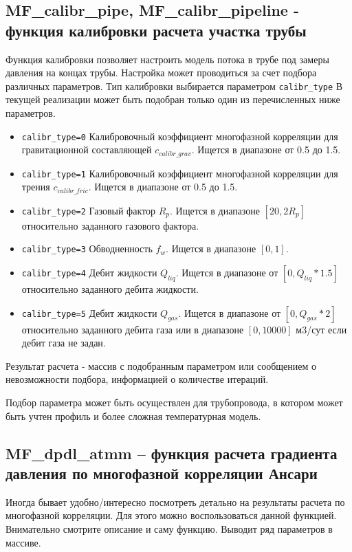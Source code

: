 \subsection{MF\_calibr\_pipe, MF\_calibr\_pipeline - функция калибровки расчета участка трубы}

Функция калибровки позволяет настроить модель потока в трубе под замеры давления на концах трубы. Настройка может проводиться за счет подбора различных параметров. Тип калибровки выбирается параметром \texttt{calibr_type} В текущей реализации может быть подобран только один из перечисленных ниже параметров.

\begin{itemize}
	\item \texttt{calibr_type=0} Калибровочный коэффициент многофазной корреляции для гравитационной составляющей  $c_{calibr\_grav}$. Ищется в диапазоне от 0.5 до 1.5.
	\item \texttt{calibr_type=1} Калибровочный коэффициент многофазной корреляции для трения $c_{calibr\_fric}$. Ищется в диапазоне от 0.5 до 1.5.
	\item \texttt{calibr_type=2} Газовый фактор $R_p$. Ищется в диапазоне $[20, 2 R_p]$ относительно заданного газового фактора. 
	\item \texttt{calibr_type=3} Обводненность $f_w$.  Ищется в диапазоне $[0, 1]$.  
	\item \texttt{calibr_type=4} Дебит жидкости \(Q_{liq} \). Ищется в диапазоне от \([0,Q_{liq}*1.5 ]\) относительно заданного дебита жидкости. 	 
	\item \texttt{calibr_type=5} Дебит жидкости \(Q_{gas} \). Ищется в диапазоне от \([0,Q_{gas}*2 ]\) относительно заданного дебита газа или в диапазоне \([0,10000 ]\) м3/сут если дебит газа не задан. 	
\end{itemize}

Результат расчета - массив с подобранным параметром или сообщением о невозможности подбора, информацией о количестве итераций. 


Подбор параметра может быть осуществлен для трубопровода, в котором может быть учтен профиль и более сложная температурная модель.




\subsection{MF\_dpdl\_atmm – функция расчета градиента давления по многофазной корреляции Ансари}  
Иногда бывает удобно/интересно посмотреть детально на результаты расчета по многофазной корреляции. Для этого можно воспользоваться данной функцией. Внимательно смотрите описание и саму функцию. Выводит ряд параметров в массиве.

